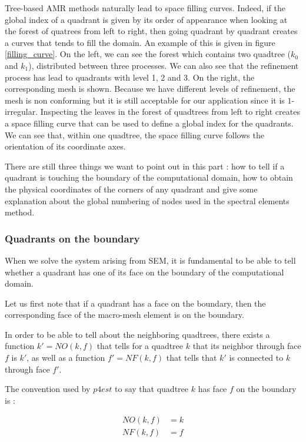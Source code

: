 Tree-based AMR methods naturally lead to space filling curves. Indeed, if the global index of a quadrant is given by its order of appearance when looking at the forest of quatrees from left to right, then going quadrant by quadrant creates a curves that tends to fill the domain. An example of this is given in figure \ref{filling_curve}. On the left, we can see the forest which contains two quadtree ($k_0$ and $k_1$), distributed between three processes. We can also see that the refinement process has lead to quadrants with level 1, 2 and 3. On the right, the corresponding mesh is shown. Because we have different levels of refinement, the mesh is non conforming but it is still acceptable for our application since it is $1$-irregular. Inspecting the leaves in the forest of quadtrees from left to right creates a space filling curve that can be used to define a global index for the quadrants. We can see that, within one quadtree, the space filling curve follows the orientation of its coordinate axes.

There are still three things we want to point out in this part : how to tell if a quadrant is touching the boundary of the computational domain, how to obtain the physical coordinates of the corners of any quadrant and give some explanation about the global numbering of nodes used in the spectral elements method. 

\subsubsection{Quadrants on the boundary}

When we solve the system arising from SEM, it is fundamental to be able to tell whether a quadrant has one of its face on the boundary of the computational domain. 

Let us first note that if a quadrant has a face on the boundary, then the corresponding face of the macro-mesh element is on the boundary. 

In order to be able to tell about the neighboring quadtrees, there exists a function $k'=NO(k,f)$ that tells for a quadtree $k$ that its neighbor through face $f$ is $k'$, as well as a function $f' = NF(k,f)$ that tells that $k'$ is connected to $k$ through face $f'$. 

The convention used by $p4est$ to say that quadtree $k$ has face $f$ on the boundary is : 

\begin{align*}
NO(k,f) &= k\\
NF(k,f) &= f
\end{align*}

